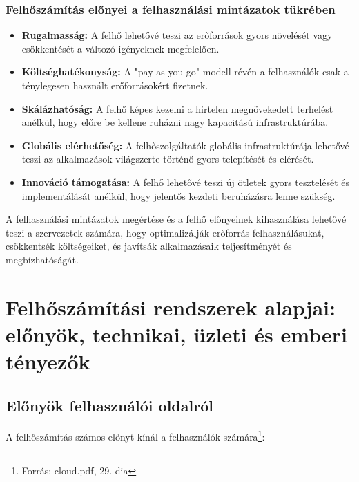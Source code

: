 \documentclass[a4paper,12pt]{article}
\begin{document}
    \subsubsection{Felhőszámítás előnyei a felhasználási mintázatok tükrében}

    \begin{itemize}
        \item \textbf{Rugalmasság:} A felhő lehetővé teszi az erőforrások gyors növelését vagy csökkentését a változó igényeknek megfelelően.

        \item \textbf{Költséghatékonyság:} A "pay-as-you-go" modell révén a felhasználók csak a ténylegesen használt erőforrásokért fizetnek.

        \item \textbf{Skálázhatóság:} A felhő képes kezelni a hirtelen megnövekedett terhelést anélkül, hogy előre be kellene ruházni nagy kapacitású infrastruktúrába.

        \item \textbf{Globális elérhetőség:} A felhőszolgáltatók globális infrastruktúrája lehetővé teszi az alkalmazások világszerte történő gyors telepítését és elérését.

        \item \textbf{Innováció támogatása:} A felhő lehetővé teszi új ötletek gyors tesztelését és implementálását anélkül, hogy jelentős kezdeti beruházásra lenne szükség.
    \end{itemize}

    A felhasználási mintázatok megértése és a felhő előnyeinek kihasználása lehetővé teszi a szervezetek számára, hogy optimalizálják erőforrás-felhasználásukat, csökkentsék költségeiket, és javítsák alkalmazásaik teljesítményét és megbízhatóságát.

    \newpage


    \section{Felhőszámítási rendszerek alapjai: előnyök, technikai, üzleti és emberi tényezők}

    \subsection{Előnyök felhasználói oldalról}

    A felhőszámítás számos előnyt kínál a felhasználók számára\footnote{Forrás: cloud.pdf, 29. dia}:
\end{document}
